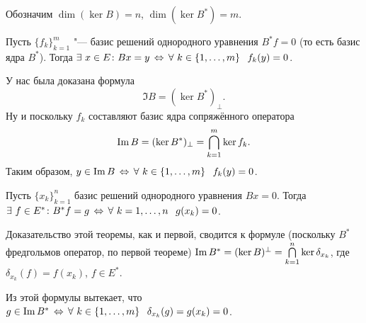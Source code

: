Обозначим $\dim(\ker B) = n$, $\dim (\ker B^*) = m$.

\begin{The}
  Пусть $\{f_k\}_{k=1}^m$ "--- базис решений однородного уравнения $B^*f=0$ (то есть базис ядра $B^*$). Тогда $\exists\ x\in E\colon Bx=y\iff \forall\ k\in\{1,\dots,m\}\pau f_k(y)=0$.
\end{The}
\begin{Proof}
  У нас была доказана формула 
\[\Im B = (\ker B^*)_\perp.\]
Ну и поскольку $f_k$ составляют базис ядра сопряжённого оператора
\[\mathop{\mathrm{Im}} B = (\ker B^*)_\perp= \bigcap\limits_{k=1}^{m} \ker f_k.\]
Таким образом, $y\in \Im B\iff \forall\ k\in\{1,\dots, m\}\pau f_k(y) = 0$.
\end{Proof}

\begin{The}
  Пусть $\{x_k\}_{k=1}^n$ базис решений однородного уравнения $Bx=0$. Тогда $\exists\ f\in E^*\colon B^*f = g\,\Leftrightarrow\, \forall\ k=1,\dots,n\hskip .75em plus.1em minus.08em\relax g(x_k)=0$.
\end{The}
\begin{Proof}
Доказательство этой теоремы, как и первой, сводится к формуле (поскольку $B^*$ фредгольмов оператор, по первой теореме) $\mathop{\mathrm{Im}} B^* = (\ker B)^\perp = \bigcap\limits_{k=1}^{n}\ker \delta_{x_k}$, где 
$\delta_{x_k}(f) = f(x_k)$, $f\in E^*$.

Из этой формулы вытекает, что $g\in \mathop{\mathrm{Im}} B^*\,\Leftrightarrow\,\forall\ k\in\{1,\dots,m\}\hskip .75em plus.1em minus.08em\relax  \delta_{x_k}(g) = g(x_k) = 0$.
\end{Proof}

